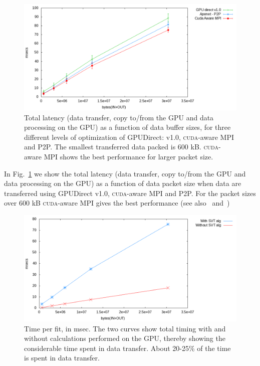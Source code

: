 \documentclass[a4]{jpconf}
\providecommand{\fixme}[1]{\xspace{\sffamily{[\bfseries{}FIXME:} #1]}}
\begin{document}
\begin{figure}[tbp]
  \centering
  \includegraphics[width=0.9\linewidth]{figures/datatransfer}
  \caption{Total latency (data transfer, copy to/from the GPU and data
    processing on the GPU) as a function of data buffer sizes, for
    three different levels of optimization of GPUDirect: v1.0,
    \textsc{cuda}-aware MPI and P2P. The smallest transferred data
    packed is 600 kB.  \textsc{cuda}-aware MPI shows the best
    performance for larger packet size.}
  \label{fig:xferlatency}
\end{figure}

In Fig.~\ref{fig:xferlatency} we show the total latency (data
transfer, copy to/from the GPU and data processing on the GPU) as a
function of data packet size when data are transferred using GPUDirect
v1.0, \textsc{cuda}-aware MPI and P2P. For the packet sizes over 600
kB \textsc{cuda}-aware MPI gives the best performance (see
also~\cite{NSS2012} and~\cite{bib_mvapich})  %


\begin{figure}[tbp]
  \centering
  \includegraphics[width=0.9\linewidth]{figures/cudaware}
  \caption{Time per fit, in msec. The two curves show total timing
    with and without calculations performed on the GPU, thereby
    showing the considerable time spent in data transfer. About
    20-25\% of the time is spent in data transfer.}
  \label{fig:transferOnly}
\end{figure}
\end{document}
